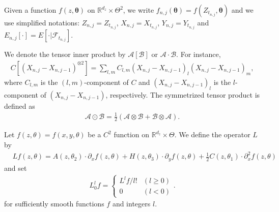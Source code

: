 \documentclass[a4paper,11pt]{jsarticle}
\begin{document}
Given a function $f(z,\boldsymbol{\theta})$ on $\mathbb{R}^{d_z} \times \Theta^2$, we write $f_{n,j}(\boldsymbol{\theta}) = f(Z_{t_{n,j}},\boldsymbol{\theta})$ and we use simplified notations: $Z_{n,j} = Z_{t_{n,j}}$, $X_{n,j} = X_{t_{n,j}}$, $Y_{n,j} = Y_{t_{n,j}}$ and $E_{n,j}[ \cdot] = E[\cdot | \mathcal{F}_{t_{n,j}} ]$. 


We denote the tensor inner product by $\mathcal{A}[\mathcal{B}]$ or $\mathcal{A} \cdot \mathcal{B}$. For instance,
\begin{align}
C[(X_{n,j}  - X_{n,j-1} )^{\otimes 2} ] = \sum_{l,m} C_{l,m} (X_{n,j} - X_{n,j-1})_l (X_{n,j} - X_{{n,j-1}})_m,
\end{align}where $C_{l,m} $ is the $(l,m)$-component of $C$ and $(X_{n,j} - X_{n,j-1})_l $ is the $l$-component of $(X_{n,j} -X_{n,j-1}) $, respectively. The symmetrized tensor product is defined as
\begin{align}
\mathcal{A} \odot \mathcal{B} =\frac{1}{2} (\mathcal{A} \otimes \mathcal{B} + \mathcal{B} \otimes \mathcal{A}).
\end{align}


Let $f(z,\theta) = f(x,y,\theta)$ be a $C^2$ function on $\mathbb{R}^{d_z} \times \Theta$. We define the operator $L$ by
\begin{align}
& Lf(z,\theta) = A(z,\theta_2) \cdot \partial_x f(z,\theta) + H(z,\theta_3) \cdot \partial_y f(z,\theta) + \frac{1}{2} C(z,\theta_1) \cdot \partial_x^2 f(z,\theta)
\end{align}
and set
\begin{align}
    L^l_0 f = \begin{cases}
      L^l f / l! & (l \geq 0) \\  0 & (l <0)
    \end{cases}.
\end{align}
for sufficiently smooth functions $f$ and integers $l$.
\end{document}

